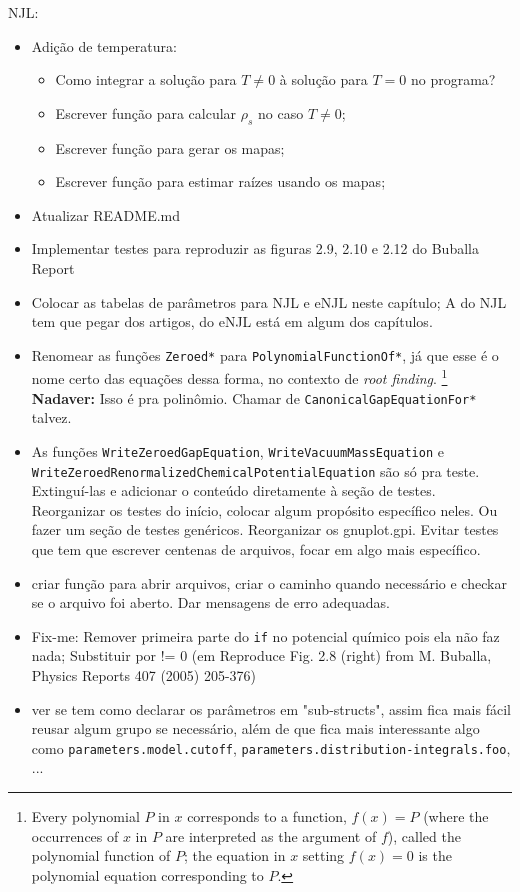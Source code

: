 NJL:
\begin{itemize}
	\item Adição de temperatura:
		\begin{itemize}
			\item Como integrar a solução para $T \neq 0$ à solução para $T = 0$ no programa?
			\item Escrever função para calcular $\rho_s$ no caso $T \neq 0$;
			\item Escrever função para gerar os mapas;
			\item Escrever função para estimar raízes usando os mapas;
		\end{itemize}
	\item Atualizar README.md
	\item Implementar testes para reproduzir as figuras 2.9, 2.10 e 2.12 do Buballa Report
	\item Colocar as tabelas de parâmetros para NJL e eNJL neste capítulo; A do NJL tem que pegar dos artigos, do eNJL está em algum dos capítulos.
	\item Renomear as funções \texttt{Zeroed*} para \texttt{PolynomialFunctionOf*}, já que esse é o nome certo das equações dessa forma, no contexto de \emph{root finding}. \footnote{Every polynomial $P$ in $x$ corresponds to a function, $f(x) = P$ (where the occurrences of $x$ in $P$ are interpreted as the argument of $f$), called the polynomial function of $P$; the equation in $x$ setting $f(x) = 0$ is the polynomial equation corresponding to $P$.} \textbf{Nadaver:} Isso é pra polinômio. Chamar de \texttt{CanonicalGapEquationFor*} talvez.
	\item As funções \texttt{WriteZeroedGapEquation}, \texttt{WriteVacuumMassEquation} e \texttt{WriteZeroedRenormalizedChemicalPotentialEquation} são só pra teste. Extinguí-las e adicionar o conteúdo diretamente à seção de testes. Reorganizar os testes do início, colocar algum propósito específico neles. Ou fazer um seção de testes genéricos. Reorganizar os gnuplot.gpi. Evitar testes que tem que escrever centenas de arquivos, focar em algo mais específico.
	\item criar função para abrir arquivos, criar o caminho quando necessário e checkar se o arquivo foi aberto. Dar mensagens de erro adequadas.
	\item Fix-me: Remover primeira parte do \texttt{if} no potencial químico pois ela não faz nada; Substituir por != 0 (em Reproduce Fig. 2.8 (right) from  M. Buballa, Physics Reports 407 (2005) 205-376)
	\item ver se tem como declarar os parâmetros em "sub-structs", assim fica mais fácil reusar algum grupo se necessário, além de que fica mais interessante algo como \texttt{parameters.model.cutoff}, \texttt{parameters.distribution-integrals.foo}, ...

\end{itemize}
